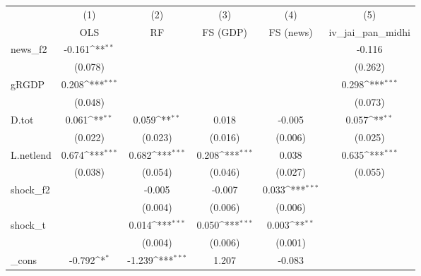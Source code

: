 {
\def\sym#1{\ifmmode^{#1}\else\(^{#1}\)\fi}
\begin{tabular}{l*{5}{c}}
\toprule
            &\multicolumn{1}{c}{(1)}&\multicolumn{1}{c}{(2)}&\multicolumn{1}{c}{(3)}&\multicolumn{1}{c}{(4)}&\multicolumn{1}{c}{(5)}\\
            &\multicolumn{1}{c}{OLS}&\multicolumn{1}{c}{RF}&\multicolumn{1}{c}{FS (GDP)}&\multicolumn{1}{c}{FS (news)}&\multicolumn{1}{c}{iv\_jai\_pan\_midhi}\\
\midrule
news\_f2     &      -0.161\sym{**} &                     &                     &                     &      -0.116         \\
            &     (0.078)         &                     &                     &                     &     (0.262)         \\
\addlinespace
gRGDP       &       0.208\sym{***}&                     &                     &                     &       0.298\sym{***}\\
            &     (0.048)         &                     &                     &                     &     (0.073)         \\
\addlinespace
D.tot       &       0.061\sym{**} &       0.059\sym{**} &       0.018         &      -0.005         &       0.057\sym{**} \\
            &     (0.022)         &     (0.023)         &     (0.016)         &     (0.006)         &     (0.025)         \\
\addlinespace
L.netlend   &       0.674\sym{***}&       0.682\sym{***}&       0.208\sym{***}&       0.038         &       0.635\sym{***}\\
            &     (0.038)         &     (0.054)         &     (0.046)         &     (0.027)         &     (0.055)         \\
\addlinespace
shock\_f2    &                     &      -0.005         &      -0.007         &       0.033\sym{***}&                     \\
            &                     &     (0.004)         &     (0.006)         &     (0.006)         &                     \\
\addlinespace
shock\_t     &                     &       0.014\sym{***}&       0.050\sym{***}&       0.003\sym{**} &                     \\
            &                     &     (0.004)         &     (0.006)         &     (0.001)         &                     \\
\addlinespace
\_cons      &      -0.792\sym{*}  &      -1.239\sym{***}&       1.207         &      -0.083         &                     \\

\end{tabular}}
